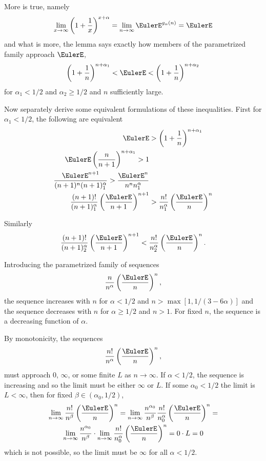 \documentclass[12pt]{article}
\begin{document}
More is true, namely
\[
    \lim_{x \to \infty} \left( 1 + \frac{1}{x} \right)^{x + \alpha} =
    \lim_{n \to \infty}\EulerE^{g_\alpha(n)} = \EulerE
\] and what is more, the lemma says exactly how members of the
parametrized family approach \( \EulerE \),
\[
    \left( 1 + \frac{1}{n} \right)^{n + \alpha_1} < \EulerE < \left( 1 +
    \frac{1}{n} \right)^{n + \alpha_2}
\] for \( \alpha_1 < 1/2 \) and \( \alpha_2 \ge 1/2 \) and \( n \)
sufficiently large.

Now separately derive some equivalent formulations of these
inequalities.  First for \( \alpha_1 < 1/2 \), the following are
equivalent
\begin{align*}
    \EulerE &> \left( 1 + \frac{1}{n} \right)^{n + \alpha_1} \\
    \EulerE \left(\frac{n}{n+1} \right)^{n + \alpha_1} > 1\\
    \frac{\EulerE^{n+1}}{(n+1)^n (n+1)^\alpha_1} > \frac{\EulerE^n}{n^n
    n^\alpha_1} \\
    \frac{(n+1)!}{(n+1)^\alpha_1} \left( \frac{\EulerE}{n+1} \right)^{n+1}
    &> \frac{n!}{n^\alpha_1}\left( \frac{\EulerE}{n} \right)^n
\end{align*}

Similarly
\[
    \frac{(n+1)!}{(n+1)^\alpha_2} \left( \frac{\EulerE}{n+1} \right)^{n+1}
    < \frac{n!}{n^\alpha_2}\left( \frac{\EulerE}{n} \right)^n.
\]

Introducing the parametrized family of sequences
\[
    \frac{n}{n^\alpha}\left( \frac{\EulerE}{n} \right)^n,
\] the sequence increases with \( n \) for \( \alpha < 1/2 \) and \( n >
\max[1, 1/(3-6 \alpha)] \) and the sequence decreases with \( n \) for \(
\alpha \ge 1/2 \) and \( n > 1 \).  For fixed \( n \), the sequence is a
decreasing function of \( \alpha \).

By monotonicity, the sequences
\[
    \frac{n!}{n^\alpha}\left( \frac{\EulerE}{n} \right)^n,
\] must approach \( 0 \), \( \infty \), or some finite \( L \) as \( n
\to \infty \).  If \( \alpha < 1/2 \), the sequence is increasing and so
the limit must be either \( \infty \) or \( L \).  If some \( \alpha_0 <
1/2 \) the limit is \( L < \infty \), then for fixed \( \beta \in (\alpha_0,
1/2) \),
\begin{multline*}
    \lim_{n \to \infty}\frac{n!}{n^\beta}\left( \frac{\EulerE}{n} \right)^n
    = \lim_{n \to \infty} \frac{n^{\alpha_0}}{n^{\beta}}\frac{n!}{n^\alpha_0}\left
    ( \frac{\EulerE}{n} \right)^n = \\
    \lim_{n \to \infty} \frac{n^{\alpha_0}}{n^{\beta}} \cdot \lim_{n \to
    \infty}\frac{n!}{n^\alpha_0}\left( \frac{\EulerE}{n} \right)^n = 0
    \cdot L = 0
\end{multline*}
which is not possible, so the limit must be \( \infty \) for all \(
\alpha < 1/2 \).
\end{document}
